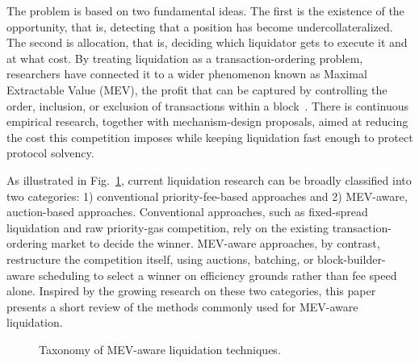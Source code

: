 \documentclass{llncs}
\begin{document}
The problem is based on two fundamental ideas. The first is the
existence of the opportunity, that is, detecting that a position has
become undercollateralized. The second is allocation, that is, deciding
which liquidator gets to execute it and at what cost. By treating
liquidation as a transaction-ordering problem, researchers have connected
it to a wider phenomenon known as Maximal Extractable Value (MEV), the
profit that can be captured by controlling the order, inclusion, or
exclusion of transactions within a block~\cite{daian2019flash}. There is
continuous empirical research, together with mechanism-design proposals,
aimed at reducing the cost this competition imposes while keeping
liquidation fast enough to protect protocol solvency.

As illustrated in Fig.~\ref{fig:taxonomy}, current liquidation research
can be broadly classified into two categories: 1) conventional
priority-fee-based approaches and 2) MEV-aware, auction-based
approaches. Conventional approaches, such as fixed-spread liquidation and
raw priority-gas competition, rely on the existing transaction-ordering
market to decide the winner. MEV-aware approaches, by contrast,
restructure the competition itself, using auctions, batching, or
block-builder-aware scheduling to select a winner on efficiency grounds
rather than fee speed alone. Inspired by the growing research on these
two categories, this paper presents a short review of the methods
commonly used for MEV-aware liquidation.

\begin{figure}[h]
\centering
{}
\caption{Taxonomy of MEV-aware liquidation techniques.}
\label{fig:taxonomy}
\end{figure}
\end{document}
